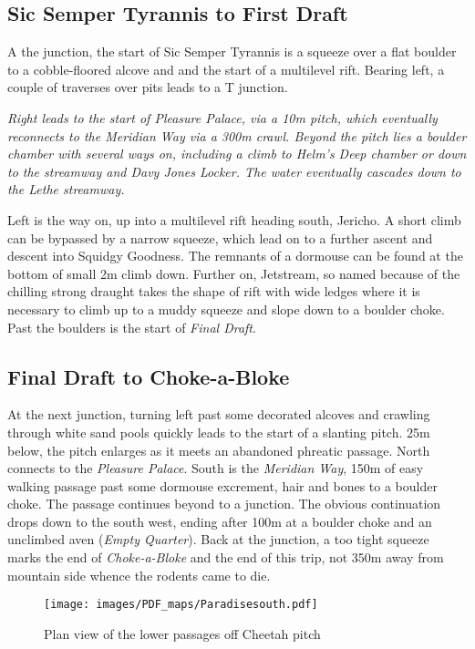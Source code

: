 \subsection{Sic Semper Tyrannis to First Draft}
A the junction, the start of Sic Semper Tyrannis is a squeeze over a flat boulder to a cobble-floored alcove and and the start of a multilevel rift. Bearing left, a couple of traverses over pits leads to a T junction. 

\textit{Right leads to the start of \emph{Pleasure Palace}, via a 10m pitch, which eventually reconnects to the \emph{Meridian Way} via a 300m crawl. Beyond the pitch lies a boulder chamber with several ways on, including a climb to \emph{Helm's Deep} chamber or down to the streamway and \emph{Davy Jones Locker}. The water eventually cascades down to the \emph{Lethe} streamway.}

Left is the way on, up into a multilevel rift heading south, Jericho. A short climb can be bypassed by a narrow squeeze, which lead on to a further ascent and descent into Squidgy Goodness. The remnants of a dormouse can be found at the bottom of small 2m climb down. Further on, Jetstream, so named because of the chilling strong draught takes the shape of rift with wide ledges where it is necessary to climb up to a muddy squeeze and slope down to a boulder choke. Past the boulders is the start of \emph{Final Draft}.

\subsection{Final Draft to Choke-a-Bloke}
At the next junction, turning left past some decorated alcoves and crawling through white sand pools quickly leads to the start of a slanting pitch. 25m below, the pitch enlarges as it meets an abandoned phreatic passage. North connects to the \emph{Pleasure Palace}. South is the \emph{Meridian Way}, 150m of easy walking passage past some dormouse excrement, hair and bones to a boulder choke. The passage continues beyond to a junction. The obvious continuation drops down to the south west, ending after 100m at a boulder choke and an unclimbed aven (\emph{Empty Quarter}). Back at the junction, a too tight squeeze marks the end of \emph{Choke-a-Bloke} and the end of this trip, not 350m away from mountain side whence the rodents came to die.



\begin{figure*}[t!]
\checkoddpage \ifoddpage \forcerectofloat \else \forceversofloat \fi
\centering
\texttt{[image: images/PDF\_maps/Paradisesouth.pdf]}
\caption{Plan view of the lower passages off Cheetah pitch}
\label{paradise}
\end{figure*}